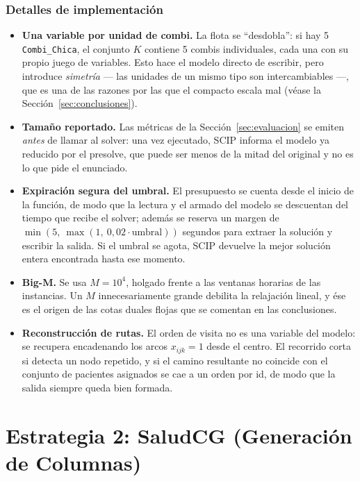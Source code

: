 \documentclass[12pt]{article}
\numberwithin{algorithm}{section}
\begin{document}
\subsubsection{Detalles de implementación}

\begin{itemize}
    \item \textbf{Una variable por unidad de combi.} La flota se ``desdobla'': si hay 5
    \texttt{Combi\_Chica}, el conjunto $K$ contiene 5 combis individuales, cada una con su
    propio juego de variables. Esto hace el modelo directo de escribir, pero introduce
    \emph{simetría} --- las unidades de un mismo tipo son intercambiables ---, que es una de
    las razones por las que el compacto escala mal (véase la Sección~\ref{sec:conclusiones}).
    \item \textbf{Tamaño reportado.} Las métricas de la Sección~\ref{sec:evaluacion} se emiten
    \emph{antes} de llamar al solver: una vez ejecutado, SCIP informa el modelo ya reducido por
    el presolve, que puede ser menos de la mitad del original y no es lo que pide el enunciado.
    \item \textbf{Expiración segura del umbral.} El presupuesto se cuenta desde el inicio de la
    función, de modo que la lectura y el armado del modelo se descuentan del tiempo que recibe
    el solver; además se reserva un margen de $\min(5,\ \max(1,\ 0{,}02\cdot\text{umbral}))$
    segundos para extraer la solución y escribir la salida. Si el umbral se agota, SCIP
    devuelve la mejor solución entera encontrada hasta ese momento.
    \item \textbf{Big-M.} Se usa $M = 10^4$, holgado frente a las ventanas horarias de las
    instancias. Un $M$ innecesariamente grande debilita la relajación lineal, y ése es el
    origen de las cotas duales flojas que se comentan en las conclusiones.
    \item \textbf{Reconstrucción de rutas.} El orden de visita no es una variable del modelo:
    se recupera encadenando los arcos $x_{ijk}=1$ desde el centro. El recorrido corta si
    detecta un nodo repetido, y si el camino resultante no coincide con el conjunto de
    pacientes asignados se cae a un orden por id, de modo que la salida siempre queda
    bien formada.
\end{itemize}

\newpage
\section{Estrategia 2: SaludCG (Generación de Columnas)}
\end{document}
